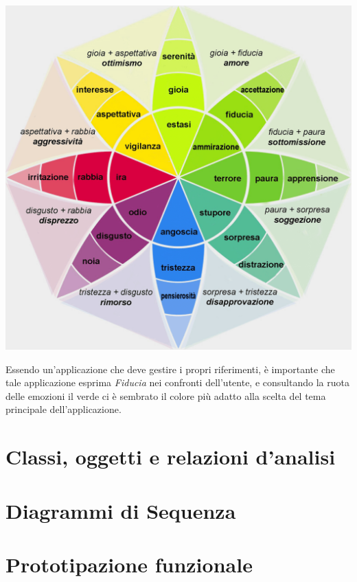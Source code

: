         \begin{center}
            \includegraphics[width=.80\textwidth]{Immagini/Ruota di Plutchik.png} 
        \end{center}
Essendo un'applicazione che deve gestire i propri riferimenti, è importante che tale applicazione esprima \textit{Fiducia} nei confronti dell'utente, e consultando la ruota delle emozioni il verde ci è sembrato il colore più adatto alla scelta del tema principale dell'applicazione.

\raggedright{\section{Classi, oggetti e relazioni d'analisi}}

\raggedright{\section{Diagrammi di Sequenza}}

\raggedright{\section{Prototipazione funzionale}}









